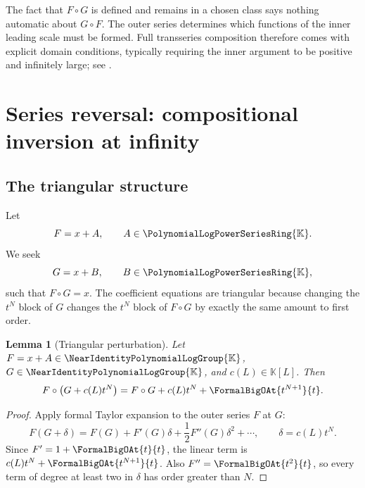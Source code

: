 \documentclass[11pt]{article}
\theoremstyle{pltheorem}
\newtheorem{lemma}[theorem]{Lemma}
\newcommand{\K}{\mathbb K}
\newcommand{\PL}{\PolynomialLogPowerSeriesRing{\K}}
\newcommand{\Gnear}{\NearIdentityPolynomialLogGroup{\K}}
\newcommand{\compose}{\mathbin{\circ}}
\begin{document}
\begin{warningbox}
The fact that \(F\compose G\) is defined and remains in a chosen class says nothing automatic about \(G\compose F\).  The outer series determines which functions of the inner leading scale must be formed.  Full transseries composition therefore comes with explicit domain conditions, typically requiring the inner argument to be positive and infinitely large; see \cite{edgar-composition,vanderhoeven-book}.
\end{warningbox}

\section{Series reversal: compositional inversion at infinity}
\label{sec:reversion}

\subsection{The triangular structure}

Let
\begin{equation}\label{eq:F-reversion}
 F=x+A,
 \qquad A\in\PL.
\end{equation}
We seek
\begin{equation}\label{eq:G-reversion}
 G=x+B,
 \qquad B\in\PL,
\end{equation}
such that \(F\compose G=x\).  The coefficient equations are triangular because changing the \(t^N\) block of \(G\) changes the \(t^N\) block of \(F\compose G\) by exactly the same amount to first order.

\begin{lemma}[Triangular perturbation]\label{lem:triangular-perturbation}
Let \(F=x+A\in\Gnear\), \(G\in\Gnear\), and \(c(L)\in\K[L]\).  Then
\begin{equation}\label{eq:triangular-perturbation}
 F\compose\bigl(G+c(L)t^N\bigr)
 =F\compose G+c(L)t^N+\FormalBigOAt{t^{N+1}}{t}.
\end{equation}
\end{lemma}

\begin{proof}
Apply formal Taylor expansion to the outer series \(F\) at \(G\):
\[
 F(G+\delta)=F(G)+F'(G)\delta+\frac12F''(G)\delta^2+\cdots,
 \qquad \delta=c(L)t^N.
\]
Since \(F'=1+\FormalBigOAt{t}{t}\), the linear term is
\(c(L)t^N+\FormalBigOAt{t^{N+1}}{t}\).  Also \(F''=\FormalBigOAt{t^2}{t}\), so every term of degree at least two in \(\delta\) has order greater than \(N\).
\end{proof}
\end{document}
